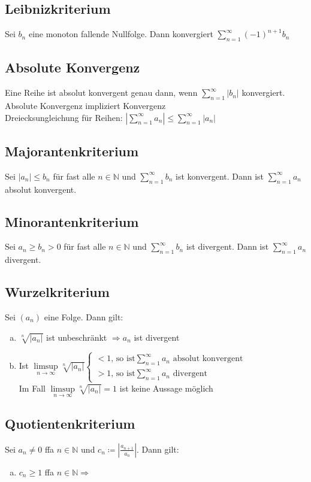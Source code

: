 \documentclass{article}
\begin{document}
\subsection{Leibnizkriterium}
Sei $b_n$ eine monoton fallende Nullfolge. Dann konvergiert $\sum \limits_{n=1}^{\infty} (-1)^{n+1} b_n$

\subsection{Absolute Konvergenz}
Eine Reihe ist absolut konvergent genau dann, wenn $\sum \limits_{n=1}^{\infty} |b_n|$ konvergiert.
Absolute Konvergenz impliziert Konvergenz \\
Dreiecksungleichung für Reihen: $|\sum \limits_{n=1}^{\infty} a_n| \leq \sum \limits_{n=1}^{\infty} |a_n|$

\subsection{Majorantenkriterium}
Sei $|a_n| \leq b_n$ für fast alle $n \in \mathbb{N}$ und $\sum \limits_{n=1}^{\infty} b_n$ ist konvergent.
Dann ist $\sum \limits_{n=1}^{\infty} a_n$ absolut konvergent.

\subsection{Minorantenkriterium}
Sei $a_n \geq b_n > 0$ für fast alle $n \in \mathbb{N}$ und $\sum \limits_{n=1}^{\infty} b_n$ ist divergent.
Dann ist $\sum \limits_{n=1}^{\infty} a_n$ divergent.

\subsection{Wurzelkriterium}
Sei $(a_n)$ eine Folge. Dann gilt:
\begin{enumerate}[a)]
    \item $\sqrt[n]{|a_n|}$ ist unbeschränkt $\Rightarrow a_n$ ist divergent
    \item Ist $\limsup \limits_{n \to \infty} \sqrt[n]{|a_n|}
    \begin{cases} <1 \text{, so ist} \sum \limits_{n=1}^{\infty} a_n \text{ absolut konvergent} \\
    > 1 \text{, so ist}  \sum \limits_{n=1}^{\infty} a_n \text{ divergent} \end{cases}$ \\
    Im Fall $\limsup \limits_{n \to \infty} \sqrt[n]{|a_n|} = 1$ ist keine Aussage möglich
\end{enumerate}

\subsection{Quotientenkriterium}
Sei $a_n \neq 0$ ffa $n \in \mathbb{N}$ und $c_n \coloneqq |\frac{a_{n+1}}{a_n}|$. Dann gilt:
\begin{enumerate}[a)]
    \item $c_n \geq 1$ ffa $n \in \mathbb{N} \Rightarrow$
\end{enumerate}
\end{document}
